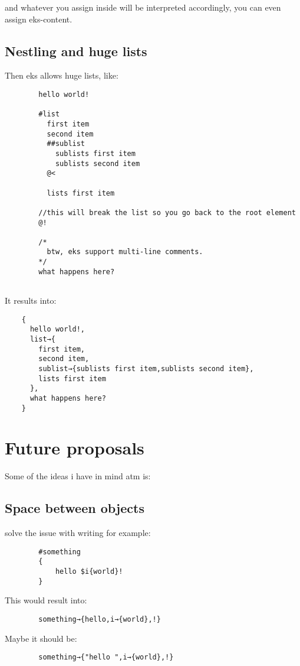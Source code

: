 \documentclass{book}
\begin{document}
	and whatever you assign inside will be interpreted accordingly, you can even assign eks-content.
	
	\section{Nestling and huge lists}
	
	Then eks allows huge lists, like:
	
	\begin{verbatim}
		hello world!
		
		#list
		  first item
		  second item
		  ##sublist
		    sublists first item
		    sublists second item
		  @<
		  
		  lists first item
		  
		//this will break the list so you go back to the root element
		@!
		
		/*
		  btw, eks support multi-line comments.
		*/
		what happens here?
		
	\end{verbatim}
	
	It results into:
	
	\begin{verbatim}
	{
	  hello world!,
	  list→{
	    first item,
	    second item,
	    sublist→{sublists first item,sublists second item},
	    lists first item
	  },
	  what happens here?
	}
	\end{verbatim}
	
	\chapter{Future proposals}
	
	Some of the ideas i have in mind atm is:
	
	\section{Space between objects}
		solve the issue with writing for example:
		\begin{verbatim}
		#something
		{
			hello $i{world}!
		}
		\end{verbatim}
		
		This would result into:
		
		\begin{verbatim}
		something→{hello,i→{world},!}
		\end{verbatim}
		
		Maybe it should be:
		
		\begin{verbatim}
		something→{"hello ",i→{world},!}
		\end{verbatim}
		
\end{document}

